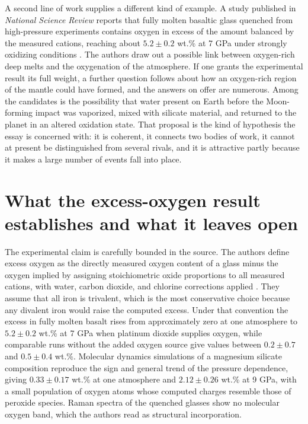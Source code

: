 \documentclass[11pt]{article}
\begin{document}
A second line of work supplies a different kind of example. A study published in \emph{National Science Review} reports that fully molten basaltic glass quenched from high-pressure experiments contains oxygen in excess of the amount balanced by the measured cations, reaching about $5.2 \pm 0.2$ wt.\% at 7 GPa under strongly oxidizing conditions \cite{xu2026}. The authors draw out a possible link between oxygen-rich deep melts and the oxygenation of the atmosphere. If one grants the experimental result its full weight, a further question follows about how an oxygen-rich region of the mantle could have formed, and the answers on offer are numerous. Among the candidates is the possibility that water present on Earth before the Moon-forming impact was vaporized, mixed with silicate material, and returned to the planet in an altered oxidation state. That proposal is the kind of hypothesis the essay is concerned with: it is coherent, it connects two bodies of work, it cannot at present be distinguished from several rivals, and it is attractive partly because it makes a large number of events fall into place.

\section{What the excess-oxygen result establishes and what it leaves open}

The experimental claim is carefully bounded in the source. The authors define excess oxygen as the directly measured oxygen content of a glass minus the oxygen implied by assigning stoichiometric oxide proportions to all measured cations, with water, carbon dioxide, and chlorine corrections applied \cite{xu2026}. They assume that all iron is trivalent, which is the most conservative choice because any divalent iron would raise the computed excess. Under that convention the excess in fully molten basalt rises from approximately zero at one atmosphere to $5.2 \pm 0.2$ wt.\% at 7 GPa when platinum dioxide supplies oxygen, while comparable runs without the added oxygen source give values between $0.2 \pm 0.7$ and $0.5 \pm 0.4$ wt.\%. Molecular dynamics simulations of a magnesium silicate composition reproduce the sign and general trend of the pressure dependence, giving $0.33 \pm 0.17$ wt.\% at one atmosphere and $2.12 \pm 0.26$ wt.\% at 9 GPa, with a small population of oxygen atoms whose computed charges resemble those of peroxide species. Raman spectra of the quenched glasses show no molecular oxygen band, which the authors read as structural incorporation.
\end{document}
